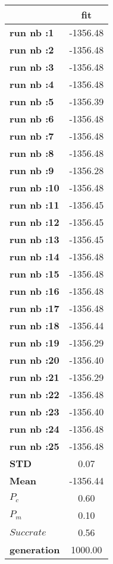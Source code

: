\begin{tiny}\begin{tabular}{|l|c|}
\hline
&\textbf{fit}\\\hline
\textbf{run nb :1}&-1356.48\\\hline
\textbf{run nb :2}&-1356.48\\\hline
\textbf{run nb :3}&-1356.48\\\hline
\textbf{run nb :4}&-1356.48\\\hline
\textbf{run nb :5}&-1356.39\\\hline
\textbf{run nb :6}&-1356.48\\\hline
\textbf{run nb :7}&-1356.48\\\hline
\textbf{run nb :8}&-1356.48\\\hline
\textbf{run nb :9}&-1356.28\\\hline
\textbf{run nb :10}&-1356.48\\\hline
\textbf{run nb :11}&-1356.45\\\hline
\textbf{run nb :12}&-1356.45\\\hline
\textbf{run nb :13}&-1356.45\\\hline
\textbf{run nb :14}&-1356.48\\\hline
\textbf{run nb :15}&-1356.48\\\hline
\textbf{run nb :16}&-1356.48\\\hline
\textbf{run nb :17}&-1356.48\\\hline
\textbf{run nb :18}&-1356.44\\\hline
\textbf{run nb :19}&-1356.29\\\hline
\textbf{run nb :20}&-1356.40\\\hline
\textbf{run nb :21}&-1356.29\\\hline
\textbf{run nb :22}&-1356.48\\\hline
\textbf{run nb :23}&-1356.40\\\hline
\textbf{run nb :24}&-1356.48\\\hline
\textbf{run nb :25}&-1356.48\\\hline
\textbf{STD}&0.07\\\hline
\textbf{Mean}&-1356.44\\\hline
\textbf{$P_c$}&0.60\\\hline
\textbf{$P_{m}$}&0.10\\\hline
\textbf{$Succ rate$}&0.56\\\hline
\textbf{generation}&1000.00\\\hline
\end{tabular}
\end{tiny}